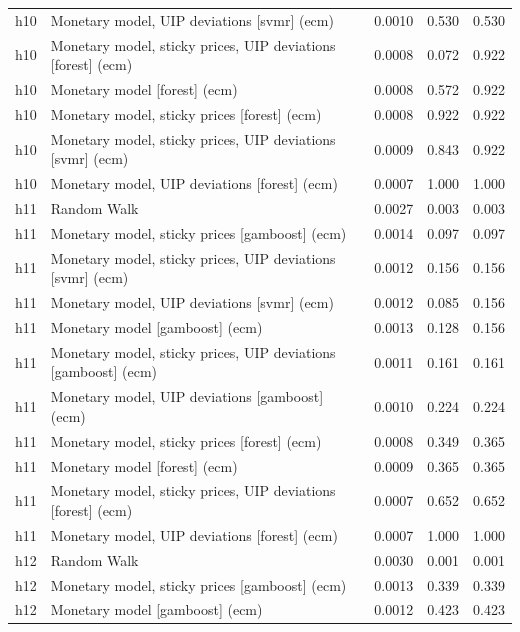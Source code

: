 \begin{ThreePartTable}
\begin{longtable}[t]{cp{5.5cm}ccc}
h10 & \raggedright Monetary model, UIP deviations [svmr] (ecm) & 0.0010 & 0.530 & 0.530\\
h10 & \raggedright Monetary model, sticky prices, UIP deviations [forest] (ecm) & 0.0008 & 0.072 & 0.922\\
h10 & \raggedright Monetary model [forest] (ecm) & 0.0008 & 0.572 & 0.922\\
h10 & \raggedright Monetary model, sticky prices [forest] (ecm) & 0.0008 & 0.922 & 0.922\\
h10 & \raggedright Monetary model, sticky prices, UIP deviations [svmr] (ecm) & 0.0009 & 0.843 & 0.922\\
h10 & \raggedright Monetary model, UIP deviations [forest] (ecm) & 0.0007 & 1.000 & 1.000\\
\addlinespace
h11 & \raggedright Random Walk & 0.0027 & 0.003 & 0.003\\
h11 & \raggedright Monetary model, sticky prices [gamboost] (ecm) & 0.0014 & 0.097 & 0.097\\
h11 & \raggedright Monetary model, sticky prices, UIP deviations [svmr] (ecm) & 0.0012 & 0.156 & 0.156\\
h11 & \raggedright Monetary model, UIP deviations [svmr] (ecm) & 0.0012 & 0.085 & 0.156\\
h11 & \raggedright Monetary model [gamboost] (ecm) & 0.0013 & 0.128 & 0.156\\
h11 & \raggedright Monetary model, sticky prices, UIP deviations [gamboost] (ecm) & 0.0011 & 0.161 & 0.161\\
h11 & \raggedright Monetary model, UIP deviations [gamboost] (ecm) & 0.0010 & 0.224 & 0.224\\
h11 & \raggedright Monetary model, sticky prices [forest] (ecm) & 0.0008 & 0.349 & 0.365\\
h11 & \raggedright Monetary model [forest] (ecm) & 0.0009 & 0.365 & 0.365\\
h11 & \raggedright Monetary model, sticky prices, UIP deviations [forest] (ecm) & 0.0007 & 0.652 & 0.652\\
h11 & \raggedright Monetary model, UIP deviations [forest] (ecm) & 0.0007 & 1.000 & 1.000\\
\addlinespace
h12 & \raggedright Random Walk & 0.0030 & 0.001 & 0.001\\
h12 & \raggedright Monetary model, sticky prices [gamboost] (ecm) & 0.0013 & 0.339 & 0.339\\
h12 & \raggedright Monetary model [gamboost] (ecm) & 0.0012 & 0.423 & 0.423\\

\end{longtable}
\end{ThreePartTable}
